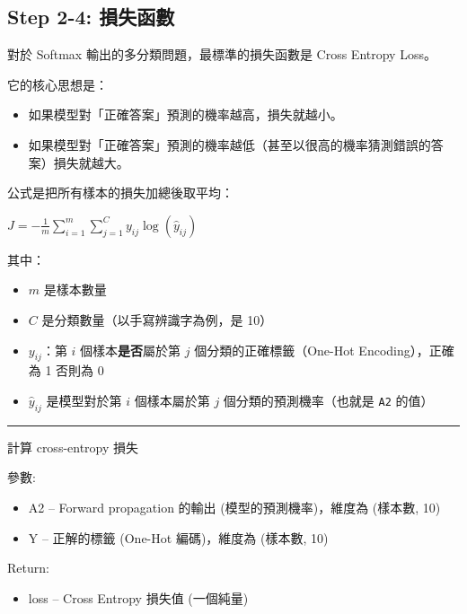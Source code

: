 \documentclass[11pt]{article}
\providecommand{\tightlist}{%
      \setlength{\itemsep}{0pt}\setlength{\parskip}{0pt}}
\begin{document}
    \subsection{Step 2-4: 損失函數}\label{step-2-4-ux640dux5931ux51fdux6578}

對於 Softmax 輸出的多分類問題，最標準的損失函數是 Cross Entropy Loss。

它的核心思想是：

\begin{itemize}
\tightlist
\item
  如果模型對「正確答案」預測的機率越高，損失就越小。
\item
  如果模型對「正確答案」預測的機率越低（甚至以很高的機率猜測錯誤的答案）損失就越大。
\end{itemize}

公式是把所有樣本的損失加總後取平均：

\(J=-\frac{1}{m}\sum_{i=1}^{m}\sum_{j=1}^{C}y_{ij}\log(\hat{y}_{ij})\)

其中：

\begin{itemize}
\tightlist
\item
  \(m\) 是樣本數量
\item
  \(C\) 是分類數量（以手寫辨識字為例，是 10）
\item
  \(y_{ij}\)：第 \(i\) 個樣本\textbf{是否}屬於第 \(j\)
  個分類的正確標籤（One-Hot Encoding），正確為 1 否則為 0
\item
  \(\hat{y}_{ij}\) 是模型對於第 \(i\) 個樣本屬於第 \(j\)
  個分類的預測機率（也就是 \texttt{A2} 的值）
\end{itemize}

\begin{center}\rule{0.5\linewidth}{0.5pt}\end{center}

計算 cross-entropy 損失

參數:

\begin{itemize}
\tightlist
\item
  A2 -- Forward propagation 的輸出 (模型的預測機率)，維度為 (樣本數, 10)
\item
  Y -- 正解的標籤 (One-Hot 編碼)，維度為 (樣本數, 10)
\end{itemize}

Return:

\begin{itemize}
\tightlist
\item
  loss -- Cross Entropy 損失值 (一個純量)
\end{itemize}
\end{document}
